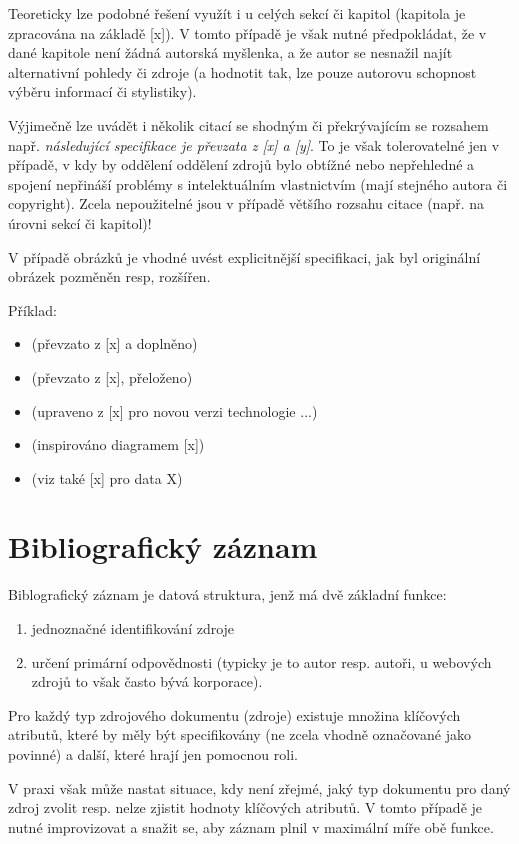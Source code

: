 \documentclass[male,czech,api_bc]{kitheses}
\begin{document}
Teoreticky lze podobné řešení využít i u celých sekcí či kapitol (kapitola je zpracována na základě [x]). V tomto případě je však nutné předpokládat, že v dané kapitole není žádná autorská myšlenka, a že autor se nesnažil najít alternativní pohledy či zdroje (a hodnotit tak, lze pouze autorovu schopnost výběru informací či stylistiky).

Výjimečně lze uvádět i několik citací se shodným či překrývajícím se rozsahem např. \textit{následující specifikace je převzata z [x] a [y]}. To je však tolerovatelné jen v případě, v kdy by oddělení oddělení zdrojů bylo obtížné nebo nepřehledné a spojení nepřináší problémy s intelektuálním vlastnictvím (mají stejného autora či copyright). Zcela nepoužitelné jsou v případě většího rozsahu citace (např. na úrovni sekcí či kapitol)!


V případě obrázků je vhodné uvést explicitnější specifikaci, jak byl originální obrázek pozměněn resp, rozšířen.

Příklad:

\begin{itemize}
\item (převzato z [x] a doplněno)
\item (převzato z [x], přeloženo)
\item (upraveno z [x] pro novou verzi technologie ...)
\item (inspirováno diagramem [x])
\item (viz také [x] pro data X)
\end{itemize}


\section{Bibliografický záznam}

Biblografický záznam je datová struktura, jenž má dvě základní funkce:

\begin{enumerate}
\item jednoznačné identifikování zdroje
\item určení primární odpovědnosti (typicky je to autor resp. autoři, u webových zdrojů to však často bývá korporace).
\end{enumerate}

Pro každý typ zdrojového dokumentu (zdroje) existuje množina klíčových atributů, které by měly být specifikovány (ne zcela vhodně označované jako povinné) a další, které hrají jen pomocnou roli.

V praxi však může nastat situace, kdy není zřejmé, jaký typ dokumentu pro daný zdroj zvolit resp.  nelze zjistit hodnoty klíčových atributů. V tomto případě je nutné improvizovat a snažit se, aby záznam plnil v maximální míře obě funkce.
\end{document}
